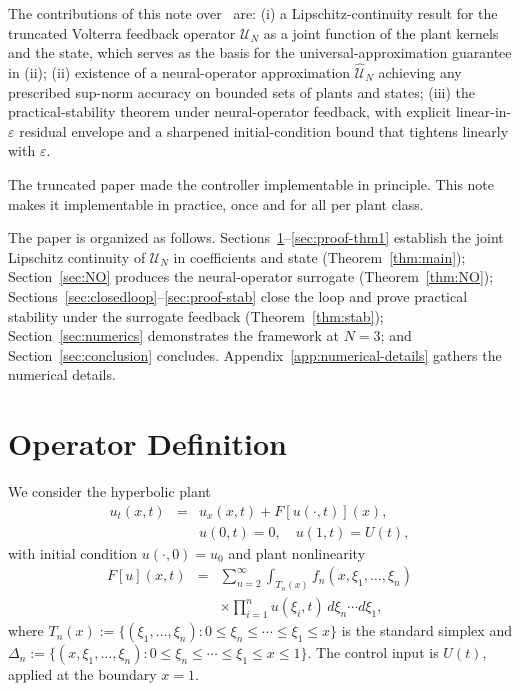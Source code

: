 \documentclass[twocolumn,amsthm]{autart}
\newcommand{\eps}{\varepsilon}
\theoremstyle{plain}
\theoremstyle{definition}
\begin{document}
The contributions of this note over~\cite{krstic2026feedbacklinearizationhyperbolicpdes-trunc} are:
(i) a Lipschitz-continuity result for the truncated Volterra feedback operator $\mathcal{U}_N$ as a joint function of the plant kernels and the state, which serves as the basis for the universal-approximation guarantee in (ii);
(ii) existence of a neural-operator approximation $\widehat{\mathcal{U}}_N$ achieving any prescribed sup-norm accuracy on bounded sets of plants and states;
(iii) the practical-stability theorem under neural-operator feedback, with explicit linear-in-$\eps$ residual envelope and a sharpened initial-condition bound that tightens linearly with $\eps$.

The truncated paper made the controller implementable in principle. This note makes it implementable in practice, once and for all per plant class.

The paper is organized as follows. Sections~\ref{sec:operator}--\ref{sec:proof-thm1} establish the joint Lipschitz continuity of $\mathcal{U}_N$ in coefficients and state (Theorem~\ref{thm:main}); Section~\ref{sec:NO} produces the neural-operator surrogate (Theorem~\ref{thm:NO}); Sections~\ref{sec:closedloop}--\ref{sec:proof-stab} close the loop and prove practical stability under the surrogate feedback (Theorem~\ref{thm:stab}); Section~\ref{sec:numerics} demonstrates the framework at $N=3$; and Section~\ref{sec:conclusion} concludes. Appendix~\ref{app:numerical-details} gathers the numerical details.

\section{Operator Definition}
\label{sec:operator}

We consider the hyperbolic plant
\begin{eqnarray}
u_t(x,t) &=& u_x(x,t) + F[u(\cdot,t)](x), \nonumber \\
&& u(0,t)=0, \quad u(1,t)=U(t),
\label{eq:plant}
\end{eqnarray}
with initial condition $u(\cdot, 0) = u_0$ and plant nonlinearity
\begin{eqnarray}
F[u](x,t) &=& \sum_{n=2}^\infty \int_{T_n(x)} f_n(x,\xi_1,\ldots,\xi_n) \nonumber \\
&& \times \prod_{i=1}^n u(\xi_i,t)\, d\xi_n\cdots d\xi_1,
\label{eq:Fdef}
\end{eqnarray}
where $T_n(x) := \{(\xi_1,\ldots,\xi_n) : 0 \le \xi_n \le \cdots \le \xi_1 \le x\}$ is the standard simplex and $\Delta_n := \{(x,\xi_1,\ldots,\xi_n) : 0 \le \xi_n \le \cdots \le \xi_1 \le x \le 1\}$. The control input is $U(t)$, applied at the boundary $x = 1$.
\end{document}
